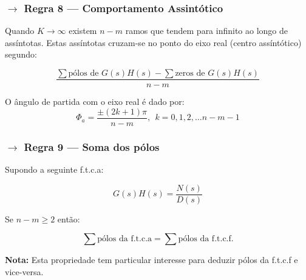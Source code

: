 \subsubsection[3.3.8 Regra 8 --- Comportamento Assintótico]{$\pmb{\rightarrow}$ Regra 8 --- Comportamento Assintótico}

\noindent Quando $K \to \infty$ existem $n - m$ ramos que tendem para infinito ao longo de assíntotas. Estas assíntotas cruzam-se no ponto do eixo real (centro assíntótico) segundo:

$$
    \boxed{\dfrac{\sum \text{pólos de }G(s)H(s) - \sum \text{zeros de }G(s)H(s)}{n - m}}
$$

\noindent O ângulo de partida com o eixo real é dado por:
$$
    \boxed{\Phi_a = \dfrac{\pm (2k + 1)\pi}{n - m},\;\, k = 0,1,2,\dots n-m-1}
$$
\subsubsection[3.3.9 Regra 9 --- Soma dos pólos]{$\pmb{\rightarrow}$ Regra 9 --- Soma dos pólos}

\noindent Supondo a seguinte  f.t.c.a:

$$
    G(s)H(s) = \dfrac{N(s)}{D(s)}
$$

\noindent Se $n - m \ge 2$ então:

$$
    \boxed{\sum \text{pólos da f.t.c.a} = \sum \text{pólos da f.t.c.f.}}
$$

\noindent\textbf{Nota:} Esta propriedade tem particular interesse para deduzir pólos da f.t.c.f e vice-versa.
